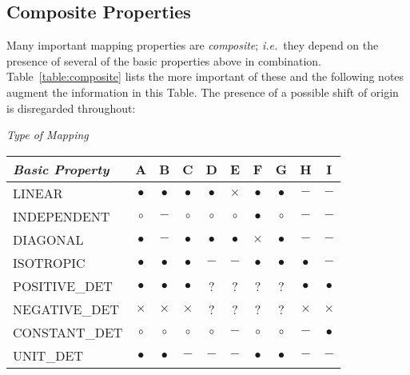 \documentclass[twoside,nolof,11pt]{starlink}
\providecommand{\req}[0]{$\bullet$}
\providecommand{\imp}[0]{$\circ$}
\providecommand{\pro}[0]{$\times$}
\providecommand{\irr}[0]{$-$}
\begin{document}
\subsection{Composite Properties}

Many important mapping properties are \emph{composite}; \emph{i.e.}\ they
depend on the presence of several of the basic properties above in
combination.
Table~\ref{table:composite} lists the more important of these and the
following notes augment the information in this Table.
The presence of a possible shift of origin is disregarded throughout:

\begin{table}
\begin{center}
\emph{Type of Mapping}\\
\begin{tabular}{|l|c|c|c|c|c|c|c|c|c|}
\hline
\emph{Basic Property}
              & A    & B    & C    & D    & E    & F    & G    & H    & I    \\
\hline
LINEAR        & \req & \req & \req & \req & \pro & \req & \req & \irr & \irr \\
INDEPENDENT   & \imp & \irr & \imp & \imp & \imp & \req & \imp & \irr & \irr \\
DIAGONAL      & \req & \irr & \req & \req & \req & \pro & \req & \irr & \irr \\
ISOTROPIC     & \req & \req & \req & \irr & \irr & \req & \req & \req & \irr \\
POSITIVE\_DET & \req & \req & \req & ?    & ?    & ?    & ?    & \req & \req \\
NEGATIVE\_DET & \pro & \pro & \pro & ?    & ?    & ?    & ?    & \pro & \pro \\
CONSTANT\_DET & \imp & \imp & \imp & \imp & \irr & \imp & \imp & \irr & \req \\
UNIT\_DET     & \req & \req & \irr & \irr & \irr & \req & \req & \irr & \irr \\
\hline
\end{tabular}


\end{center}
\end{table}
\end{document}
